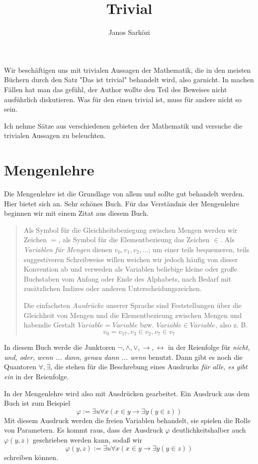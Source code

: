 \documentclass[11pt, a4paper]{article}
\title{Trivial}
\author{Janos Sarközi}
\begin{document}
\maketitle
\newpage
\tableofcontents
\newpage

Wir beschäftigen uns mit trivialen Aussagen der Mathematik, die in den meisten
Büchern durch den Satz "Das ist trivial" behandelt wird, also garnicht. In
machen Fällen hat man das gefühl, der Author wollte den Teil des Beweises
nicht ausführlich diskutieren. Was für den einen trivial ist, muss für andere
nicht so sein.

Ich nehme Sätze aus verschiedenen gebieten der Mathematik und versuche die
trivialen Aussagen zu beleuchten.

\newpage
\section{Mengenlehre} Die Mengenlehre ist die Grundlage von allem und sollte
gut behandelt werden.  Hier bietet sich \cite{Ebbinghaus2003} an. Sehr
schönes Buch. Für das Verständnis der Mengenlehre beginnen wir mit einem
Zitat aus diesem Buch.
\begin{quote}
    Als Symbol für die Gleichheitsbeziegung zwischen Mengen werden wir Zeichen
    $=$, als Symbol für die Elementbezieung das Zeichen $\in$. Als
    \textit{Variablen für Mengen} dienen $v_0, v_1, v_2, ...$; um einer teils
    bequemeren, teils suggestiveren Schreibweise willen weichen wir jedoch
    häufig von dieser Konvention ab und verweden als Variablen beliebige
    kleine oder große Buchstaben vom Anfang oder Ende des Alphabets, nach Bedarf
    mit zusätzlichen Indizes oder anderen Unterscheidungszeichen.

    Die einfachsten \textit{Ausdrücke} unserer Sprache sind Feststellungen
    über die Gleichheit von Mengen und die Elementbezieung zwischen Mengen und
    habendie Gestalt $Variable = Variable$ bzw. $Variable \in Variable$, also
    z. B.
    \[
        v_0 = v_{17}, v_3 \in v_2, v_7 \in v_7
    \]
\end{quote}
\noindent
In diesem Buch werde die Junktoren $\lnot, \land, \lor, \rightarrow,
\leftrightarrow$ in der Reienfolge für \textit{nicht, und, oder, wenn ...
dann, genau dann ... wenn} benutzt. Dann gibt es noch die Quantoren $\forall,
\exists$, die stehen für die Beschrebung eines Ausdrucks \textit{für alle, es
gibt ein} in der Reienfolge.
\newline

\noindent
In der Mengenlehre wird also mit Ausdrücken gearbeitet. Ein Ausdruck aus dem
Buch ist zum Beispiel
\[
    \varphi := \exists u\forall x(x\in y \rightarrow \exists y(y\in z))
\]
Mit diesem Ausdruck werden die freien Variablen behandelt, sie spielen die
Rolle von Parametern. Es kommt raus, dass der Ausdruck $\varphi$
deutlichkeitshalber auch $\varphi(y, z)$ geschrieben werden kann, sodaß wir
\[
    \varphi(y, z) := \exists u\forall x(x\in y \rightarrow \exists y(y\in z))
\]
schreiben können.
\newline
\end{document}
